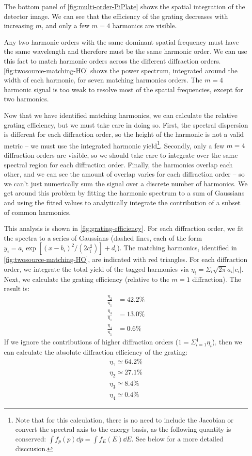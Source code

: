 The bottom panel of \cref{fig:multi-order-PiPlate} shows the spatial integration of the detector image. We can see that the efficiency of the grating decreases with increasing $m$, and only a few $m=4$ harmonics are visible.

Any two harmonic orders with the same dominant spatial frequency must have the same wavelength and therefore must be the same harmonic order. We can use this fact to match harmonic orders across the different diffraction orders. \cref{fig:twosource-matching-HO} shows the power spectrum, integrated around the width of each harmonic, for seven matching harmonics orders. The $m=4$ harmonic signal is too weak to resolve most of the spatial frequencies, except for two harmonics.

Now that we have identified matching harmonics, we can calculate the relative grating efficiency, but we must take care in doing so. First, the spectral dispersion is different for each diffraction order, so the height of the harmonic is not a valid metric -- we must use the integrated harmonic yield\footnote{Note that for this calculation, there is no need to include the Jacobian or convert the spectral axis to the energy basis, as the following quantity is conserved: $\int f_p(p) \dd{p} = \int f_E(E) \dd{E}$. See below for a more detailed disccusion.}. Secondly, only a few $m=4$ diffraction orders are visible, so we should take care to integrate over the same spectral region for each diffraction order. Finally, the harmonics overlap each other, and we can see the amount of overlap varies for each diffraction order -- so we can't just numerically sum the signal over a discrete number of harmonics. We get around this problem by fitting the harmonic spectrum to a sum of Gaussians and using the fitted values to analytically integrate the contribution of a subset of common harmonics.

This analysis is shown in \cref{fig:grating-efficiency}. For each diffraction order, we fit the spectra to a series of Gaussians (dashed lines, each of the form $y_i = a_i \exp \left[ (x-b_i)^2 / (2 c_i^2) \right] + d_i$). The matching harmonics, identified in \cref{fig:twosource-matching-HO}, are indicated with red triangles. For each diffraction order, we integrate the total yield of the tagged harmonics via $\eta_i = \Sigma_i \sqrt{2 \pi} a_i |c_i|$. Next, we calculate the grating efficiency (relative to the $m=1$ diffraction). The result is:
\begin{align*}
\frac{\eta_2}{\eta_1} &= 42.2 \% \\
\frac{\eta_3}{\eta_1} &= 13.0 \% \\
\frac{\eta_4}{\eta_1} &= 0.6 \%
\end{align*}
If we ignore the contributions of higher diffraction orders ($1 = \Sigma_{i=1}^4 \eta_i$), then we can calculate the absolute diffraction efficiency of the grating:
\begin{align*}
\eta_1 \simeq  64.2 \% \\
\eta_2 \simeq 27.1 \% \\
\eta_3 \simeq 8.4 \% \\
\eta_4 \simeq 0.4 \%
\end{align*}

